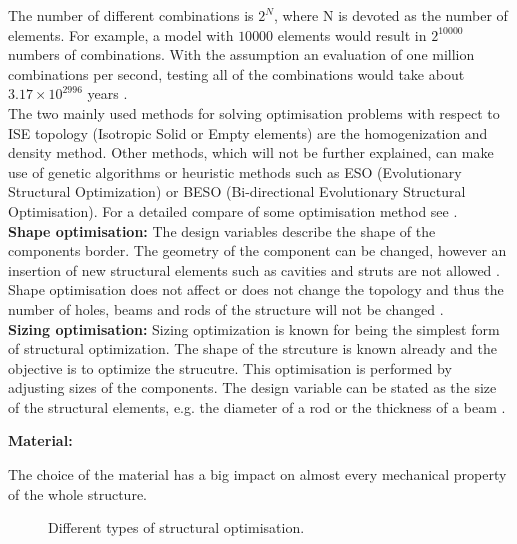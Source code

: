 The number of different combinations is $2^N$, where N is devoted as the number of elements. For example, a model with $10 000$ elements
 would result in $2^{10000}$ numbers of combinations.
 With the
 assumption an evaluation of
 one million combinations per second,
 testing all of the combinations would take about $3.17 \times 10^{2996}$ years 
\cite{Olason.2010}.\\

The two mainly used methods for solving optimisation
 problems with respect to ISE topology (Isotropic Solid or Empty elements) 
 are the homogenization and density method. 
 Other methods, which will not be further explained, can make use of genetic algorithms or heuristic methods such 
 as ESO (Evolutionary Structural Optimization) or BESO (Bi-directional Evolutionary Structural Optimisation). For a detailed compare of some optimisation
  method see \cite{Sigmund.2013}.\\
  
   {\large{\textbf{Shape optimisation:}}}
The design variables describe the shape of the components border.
The geometry of the component can be changed, however an insertion of new
structural elements such as cavities and struts are not allowed \cite{Schumacher.2013}.
Shape optimisation does not affect or does not change the topology and
thus the number of holes, beams and rods of the structure will not be changed
\cite{Olason.2010}.\\

{\large{\textbf{Sizing optimisation:}}}
Sizing optimization is known for being the simplest form of structural optimization. The shape of the strcuture is
known already and the objective is to optimize the strucutre. This optimisation is performed by adjusting
sizes of the components. The design variable can be stated as the size of the structural elements, e.g.
the diameter of a rod or the thickness of  a beam \cite{Olason.2010}. \\

\begin{large}
\textbf{Material:}
\end{large}
The choice of the material has a big impact on almost every mechanical property of the
whole structure.\\

\begin{figure} [!h]
 \centering
 \def\svgwidth{0.85\textwidth}
 
 \caption{Different types of structural optimisation. } %
 \label{fig_struc_arten}   %
\end{figure} 


